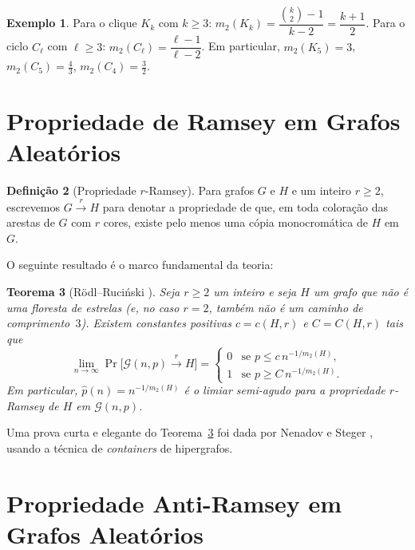 \documentclass[reqno, 12pt]{amsart}
\numberwithin{equation}{section}
\theoremstyle{plain}
\newtheorem{theorem}{Teorema}[section]
\theoremstyle{definition}
\newtheorem{definition}[theorem]{Definição}
\newtheorem{example}[theorem]{Exemplo}
\newcommand{\Gnp}{\mathcal{G}(n,p)}
\newcommand{\ramsey}[1]{\xrightarrow{\,#1\,}}
\newcommand{\mdens}{m_2}
\begin{document}
\begin{example}
  Para o clique $K_k$ com $k \ge 3$:
  $\mdens(K_k) = \dfrac{\binom{k}{2}-1}{k-2} = \dfrac{k+1}{2}$.
  Para o ciclo $C_\ell$ com $\ell \ge 3$:
  $\mdens(C_\ell) = \dfrac{\ell-1}{\ell-2}$.
  Em particular,
  $\mdens(K_5) = 3$, $\mdens(C_5) = \frac{4}{3}$, $\mdens(C_4) = \frac{3}{2}$.
\end{example}

\section{Propriedade de Ramsey em Grafos Aleatórios}

\begin{definition}[Propriedade $r$-Ramsey]
Para grafos $G$ e $H$ e um inteiro $r \ge 2$, escrevemos
$G \ramsey{r} H$ para denotar a propriedade de que,
em toda coloração das arestas de $G$ com $r$ cores,
existe pelo menos uma cópia monocromática de $H$ em $G$.
\end{definition}

O seguinte resultado é o marco fundamental da teoria:

\begin{theorem}[Rödl--Ruciński \cite{rodl1993lower, rodl1994random, rodl1995threshold}]
\label{thm:rodl-rucinski}
Seja $r \ge 2$ um inteiro e seja $H$ um grafo que não é uma floresta de estrelas
(e, no caso $r = 2$, também não é um caminho de comprimento~$3$).
Existem constantes positivas $c = c(H,r)$ e $C = C(H,r)$ tais que
\[
  \lim_{n\to\infty} \Pr\!\bigl[\Gnp \ramsey{r} H\bigr] =
  \begin{cases}
    0 & \text{se } p \le c\, n^{-1/\mdens(H)},\\
    1 & \text{se } p \ge C\, n^{-1/\mdens(H)}.
  \end{cases}
\]
Em particular, $\hat{p}(n) = n^{-1/\mdens(H)}$ é o limiar semi-agudo para
a propriedade $r$-Ramsey de $H$ em $\Gnp$.
\end{theorem}

Uma prova curta e elegante do Teorema~\ref{thm:rodl-rucinski} foi dada por
Nenadov e Steger \cite{nenadov2016short}, usando a técnica de
\emph{containers} de hipergrafos.

\section{Propriedade Anti-Ramsey em Grafos Aleatórios} \label{sec:antiramsey}
\end{document}
